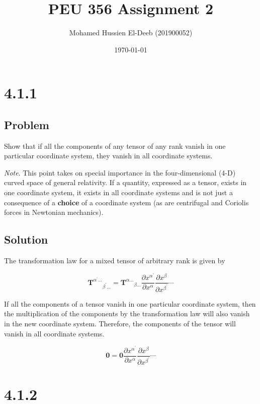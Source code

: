 \documentclass[12pt]{article}
\title{PEU 356 Assignment 2}
\author{Mohamed Hussien El-Deeb (201900052)}
\date{\today}
\begin{document}
\maketitle
\tableofcontents

\section{4.1.1}

\subsection{Problem}

Show that if all the components of any tensor of any rank vanish in one particular
coordinate system, they vanish in all coordinate systems.

\textit{Note}. This point takes on special importance in the four-dimensional (4-D) curved
space of general relativity. If a quantity, expressed as a tensor, exists in one coordinate
system, it exists in all coordinate systems and is not just a consequence of a \textbf{choice}
of a coordinate system (as are centrifugal and Coriolis forces in Newtonian mechanics).

\subsection{Solution}

The transformation law for a mixed tensor of arbitrary rank is given by

\[
    \textbf{T}^{\alpha^{\prime} \ldots}{ }_{\beta^{\prime}\ldots}
    = \textbf{T}^{\alpha \ldots}{ }_{\beta \ldots}
    \frac{\partial x^{\alpha^{\prime}}}{\partial x^\alpha}
    \frac{\partial x^\beta}{\partial x^{\beta^{\prime}}} \cdots
\]

If all the components of a tensor vanish in one particular coordinate system, then
the multiplication of the components by the transformation law will also vanish in
the new coordinate system. Therefore, the components of the tensor will vanish
in all coordinate systems.

\[
    \textbf{0} = \textbf{0} \frac{\partial x^{\alpha^{\prime}}}{\partial x^\alpha}
    \frac{\partial x^\beta}{\partial x^{\beta^{\prime}}} \cdots
\]

\section{4.1.2}
\end{document}
